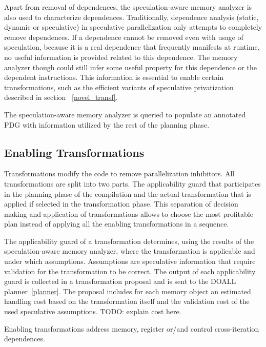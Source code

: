 Apart from removal of dependences, the speculation-aware memory
analyzer is also used to characterize dependences.
%
Traditionally, dependence analysis (static, dynamic or speculative) in
speculative parallelization only attempts to completely remove
dependences.
%
If a dependence cannot be removed even with usage of speculation,
because it is a real dependence that frequently manifests at runtime,
no useful information is provided related to this dependence.
%
The memory analyzer though could still infer some useful property for
this dependence or the dependent instructions.
%
This information is essential to enable certain transformations, such
as the efficient variants of speculative privatization described in
section ~\ref{novel_transf}.

The speculation-aware memory analyzer is queried to populate an
annotated PDG with information utilized by the rest of the planning
phase.

\subsection{Enabling Transformations}

Transformations modify the code to remove parallelization inhibitors.
%
All transformations are split into two parts. The applicability guard
that participates in the planning phase of the compilation and the
actual transformation that is applied if selected in the
transformation phase.
This separation of decision making and application of transformations
allows \name to choose the most profitable plan instead of applying
all the enabling transformations in a sequence.

%
The applicability guard of a transformation determines, using the
results of the speculation-aware memory analyzer, where the
transformation is applicable and under which assumptions. Assumptions
are speculative information that require validation for the
transformation to be correct. 
%
The output of each applicability guard is collected in a
transformation proposal and is sent to the DOALL
planner~\ref{planner}.
%
The proposal includes for each memory object an estimated handling
cost based on the transformation itself and the validation cost of the
used speculative assumptions.
%
TODO: explain cost here.
%

Enabling transformations address memory, register or/and control
cross-iteration dependences. 
%


